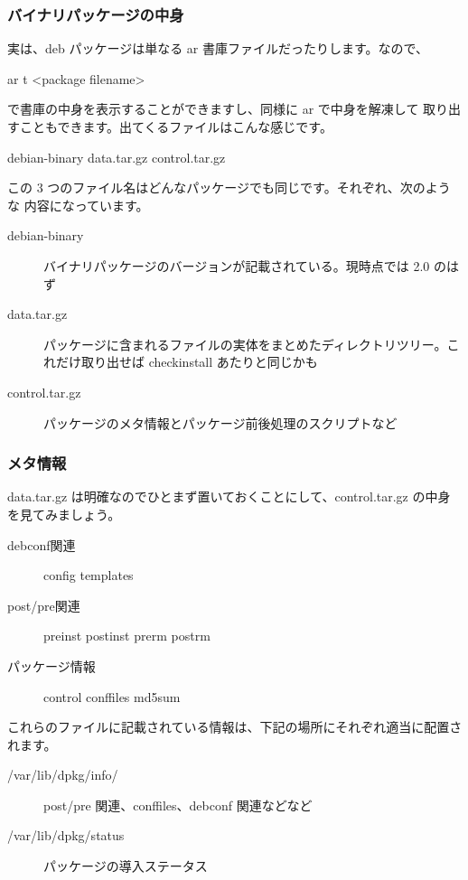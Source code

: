 \documentclass[mingoth,a4paper]{jsarticle}
\begin{document}
\subsubsection{バイナリパッケージの中身}
実は、deb パッケージは単なる ar 書庫ファイルだったりします。なので、

\begin{commandline}
ar t <package filename>
\end{commandline}

で書庫の中身を表示することができますし、同様に ar で中身を解凍して
取り出すこともできます。出てくるファイルはこんな感じです。

\begin{commandline}
debian-binary
data.tar.gz
control.tar.gz
\end{commandline}

この 3 つのファイル名はどんなパッケージでも同じです。それぞれ、次のような
内容になっています。

\begin{description}
  \item[debian-binary] バイナリパッケージのバージョンが記載されている。現時点では 2.0 のはず
  \item[data.tar.gz] パッケージに含まれるファイルの実体をまとめたディレクトリツリー。これだけ取り出せば checkinstall あたりと同じかも
  \item[control.tar.gz] パッケージのメタ情報とパッケージ前後処理のスクリプトなど
\end{description}

\subsubsection{メタ情報}
data.tar.gz は明確なのでひとまず置いておくことにして、control.tar.gz の中身を見てみましょう。

\begin{description}
\item[debconf関連] config
templates
\item[post/pre関連] preinst
postinst
prerm
postrm
\item[パッケージ情報]
control
conffiles
md5sum
\end{description}

これらのファイルに記載されている情報は、下記の場所にそれぞれ適当に配置されます。
\begin{description}
\item[/var/lib/dpkg/info/] post/pre 関連、conffiles、debconf 関連などなど
\item[/var/lib/dpkg/status] パッケージの導入ステータス
\end{description}
\end{document}
